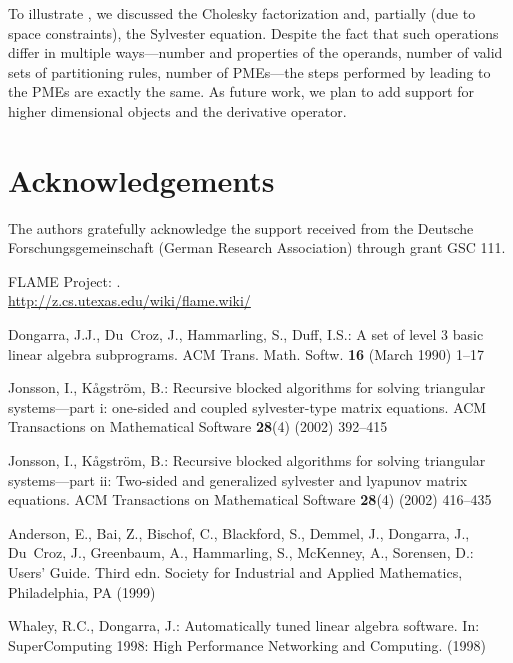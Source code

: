 \documentclass{llncs}
\newcommand{\click}{{\sc{Cl\makebox[.58\width][c]{1}ck}}}
\begin{document}
\begin{mybox}
{To illustrate \click{}, we discussed the
Cholesky factorization and, partially (due to space constraints),
the Sylvester equation. Despite the fact
that such operations differ in multiple ways---number and properties
of the operands, number of valid sets of partitioning rules, number of
PMEs---the steps performed by \click{} leading to the PMEs are
exactly the same. As future work, we plan to add support
for higher dimensional objects
and the derivative operator.

\section{Acknowledgements}
The authors gratefully acknowledge the support received from the
Deutsche Forschungsgemeinschaft (German Research Association) through
grant GSC 111.




\begin{thebibliography}{10}

{FLAME {P}roject}:
.
\newblock \\\url{http://z.cs.utexas.edu/wiki/flame.wiki/}

Dongarra, J.J., Du~Croz, J., Hammarling, S., Duff, I.S.:
\newblock A set of level 3 basic linear algebra subprograms.
\newblock ACM Trans. Math. Softw. \textbf{16} (March 1990)  1--17

Jonsson, I., K{\aa}gstr\"om, B.:
\newblock Recursive blocked algorithms for solving triangular systems---part i:
  one-sided and coupled sylvester-type matrix equations.
\newblock ACM Transactions on Mathematical Software \textbf{28}(4) (2002)
  392--415

Jonsson, I., K{\aa}gstr\"om, B.:
\newblock Recursive blocked algorithms for solving triangular systems---part
  ii: Two-sided and generalized sylvester and lyapunov matrix equations.
\newblock ACM Transactions on Mathematical Software \textbf{28}(4) (2002)
  416--435

Anderson, E., Bai, Z., Bischof, C., Blackford, S., Demmel, J., Dongarra, J.,
  Du~Croz, J., Greenbaum, A., Hammarling, S., McKenney, A., Sorensen, D.:
 Users' Guide. Third edn.
\newblock Society for Industrial and Applied Mathematics, Philadelphia, PA
  (1999)

Whaley, R.C., Dongarra, J.:
\newblock Automatically tuned linear algebra software.
\newblock In: SuperComputing 1998: High Performance Networking and Computing.
  (1998)


\end{thebibliography}}
\end{mybox}
\end{document}

